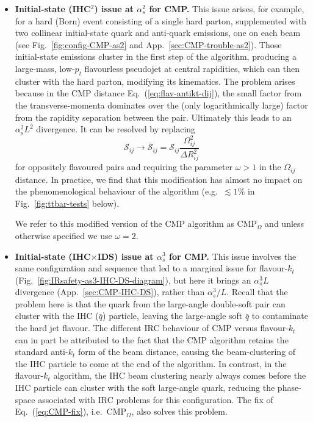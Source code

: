 \documentclass[nofootinbib,twocolumn,preprintnumbers,superscriptaddress,aps]{revtex4-2}
\newcommand{\as}{\alpha_s}
\newcommand{\cS}{\mathcal{S}}
\newcommand{\logbook}[2]{}
\begin{document}
\begin{itemize}
\item  \textbf{Initial-state (IHC$^2$) issue at $\as^2$ for CMP.}
  This
  issue arises, for example, for a hard
  (Born) event consisting of a single hard parton, supplemented with
  two collinear initial-state quark and anti-quark emissions, one on
  each beam (see Fig.~\ref{fig:config-CMP-as2} and
  App.~\ref{sec:CMP-trouble-as2}).
  Those initial-state emissions cluster in the first step of the
  algorithm, producing a large-mass, low-$p_t$ flavourless pseudojet
  at central rapidities, which can then cluster with the hard parton,
  modifying its kinematics.
  The problem arises because in the CMP distance
  Eq.~(\ref{eq:flav-antikt-dij}), the small factor from the
  transverse-momenta dominates over the (only logarithmically large)
  factor from the rapidity separation between the pair.
  Ultimately this leads to an $\as^2 L^2$ divergence. 
  It can be resolved by replacing
  \begin{equation}
    \label{eq:CMP-fix}
    \cS_{ij} \to \overline{\cS}_{ij} =  \cS_{ij} \frac{\Omega_{ij}^2}{\Delta R^2_{ij}}
  \end{equation}
  for oppositely flavoured pairs and requiring the parameter $\omega >1$
  in the $\Omega_{ij}$ distance.
  In practice, we find that this modification has almost no impact on
  the phenomenological behaviour of the algorithm (e.g.\ $\lesssim1\%$
  in Fig.~\ref{fig:ttbar-tests} below).  
  \logbook{eb847975}{
    see figures/ttbar-cmp-checks.pdf.
  }
  We refer to this modified version of the CMP
  algorithm as CMP$_\Omega$ and unless otherwise specified we use
  $\omega=2$. 

\item \textbf{Initial-state (IHC$\times$IDS) issue at $\as^3$ for CMP.}
  This
  issue involves the same
  configuration and sequence that led to a marginal issue for
  flavour-$k_t$ (Fig.~\ref{fig:IRsafety-as3-IHC-DS-diagram}), but here
  it brings an $\as^3 L$ divergence (App.~\ref{sec:CMP-IHC-DS}),
  rather than $\as^3/L$.
  Recall that the problem here is that the quark from the large-angle
  double-soft pair can cluster with the IHC ($\bar q$) particle,
  leaving the large-angle soft $\bar q$ to contaminate the hard jet
  flavour.
  The different IRC behaviour of CMP versus flavour-$k_t$ can in part
  be attributed to the fact that the CMP algorithm retains the
  standard anti-$k_t$ form of the beam distance, causing the
  beam-clustering of the IHC particle to come at the end of the
  algorithm.
  In contrast, in the flavour-$k_t$ algorithm, the IHC beam clustering
  nearly always comes before the IHC particle can cluster with the
  soft large-angle quark, reducing the phase-space
  associated with IRC problems for this configuration.
  The fix of Eq.~(\ref{eq:CMP-fix}), i.e.\ CMP$_\Omega$, also solves
  this problem.
  

\end{itemize}
\end{document}
